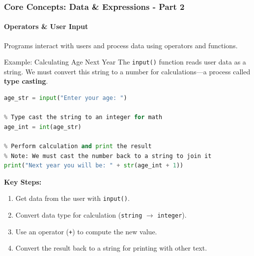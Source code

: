 \documentclass{beamer}
\begin{document}
\begin{frame}[fragile]
    \frametitle{Core Concepts: Data \& Expressions - Part 2}
    \framesubtitle{Operators \& User Input}
    
    Programs interact with users and process data using operators and functions.
    
    \begin{block}{Example: Calculating Age Next Year}
    The \texttt{input()} function reads user data as a string. We must convert this string to a number for calculations—a process called \textbf{type casting}.
    \begin{lstlisting}[language=Python]
% Get user input (which is always a string)
age_str = input("Enter your age: ")

% Type cast the string to an integer for math
age_int = int(age_str)

% Perform calculation and print the result
% Note: We must cast the number back to a string to join it
print("Next year you will be: " + str(age_int + 1))
    \end{lstlisting}
    \end{block}
    
    \textbf{Key Steps:}
    \begin{enumerate}
        \item Get data from the user with \texttt{input()}.
        \item Convert data type for calculation (\texttt{string} $\rightarrow$ \texttt{integer}).
        \item Use an operator (\texttt{+}) to compute the new value.
        \item Convert the result back to a string for printing with other text.
    \end{enumerate}
\end{frame}
\end{document}
